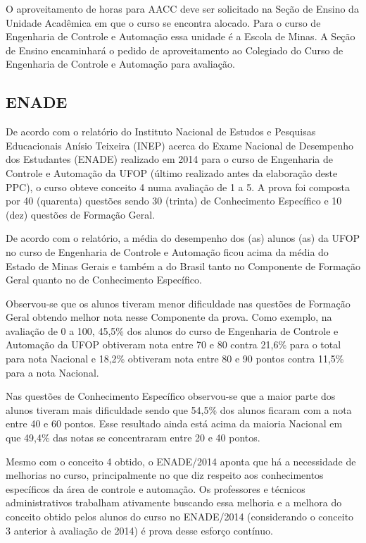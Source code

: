 O aproveitamento de horas para AACC deve ser solicitado na Seção de Ensino da Unidade Acadêmica em que o curso se encontra alocado. Para o curso de Engenharia de Controle e Automação essa unidade é a Escola de Minas. A Seção de Ensino encaminhará o pedido de aproveitamento ao Colegiado do Curso de Engenharia de Controle e Automação para avaliação.

\subsection*{ENADE}

De acordo com o relatório do Instituto Nacional de Estudos e Pesquisas Educacionais Anísio Teixeira (INEP) acerca do Exame Nacional de Desempenho dos Estudantes (ENADE) realizado em 2014 para o curso de Engenharia de Controle e Automação da UFOP (último realizado antes da elaboração deste PPC), o curso obteve conceito 4 numa avaliação de 1 a 5.  A prova foi composta por 40 (quarenta) questões sendo 30 (trinta) de Conhecimento Específico e 10 (dez) questões de Formação Geral.

De acordo com o relatório, a média do desempenho dos (as) alunos (as) da UFOP no curso de Engenharia de Controle e Automação ficou acima da média do Estado de Minas Gerais e também a do Brasil tanto no Componente de Formação Geral quanto no de Conhecimento Específico. 

Observou-se que os alunos tiveram menor dificuldade nas questões de Formação Geral obtendo melhor nota nesse Componente da prova. Como exemplo, na avaliação de 0 a 100, 45,5\% dos alunos do curso de Engenharia de Controle e Automação da UFOP obtiveram nota entre 70 e 80 contra 21,6\% para o total para nota Nacional e 18,2\% obtiveram nota entre 80 e 90 pontos contra 11,5\% para a nota Nacional.

Nas questões de Conhecimento Específico observou-se que a maior parte dos alunos tiveram mais dificuldade sendo que 54,5\% dos alunos ficaram com a nota entre 40 e 60 pontos. Esse resultado ainda está acima da maioria Nacional em que 49,4\% das notas se concentraram entre 20 e 40 pontos. 

Mesmo com o conceito 4 obtido, o ENADE/2014 aponta que há a necessidade de melhorias no curso, principalmente no que diz respeito aos conhecimentos específicos da área de controle e automação. Os professores e técnicos administrativos trabalham ativamente buscando essa melhoria e a melhora do conceito obtido pelos alunos do curso no ENADE/2014 (considerando o conceito 3 anterior à avaliação de 2014) é prova desse esforço contínuo. 

